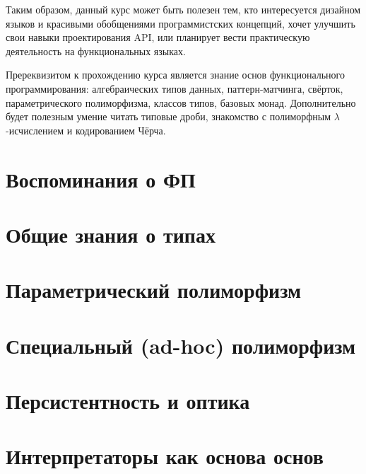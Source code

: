 \documentclass[12pt]{article}
\begin{document}
    Таким образом, данный курс может быть полезен тем, кто интересуется дизайном языков и красивыми обобщениями программистских концепций, хочет улучшить свои навыки проектирования API, или планирует вести практическую деятельность на функциональных языках.

    Пререквизитом к прохождению курса является знание основ функционального программирования: алгебраических типов данных, паттерн-матчинга, свёрток, параметрического полиморфизма, классов типов, базовых монад.
    Дополнительно будет полезным умение читать типовые дроби, знакомство с полиморфным $\lambda$-исчислением и кодированием Чёрча.


    \clearpage


    \section{Воспоминания о ФП}

    

    \clearpage


    \section{Общие знания о типах}

    

    \clearpage


    \section{Параметрический полиморфизм} \label{sec:parametric-polymorphism}

    

    \clearpage


    \section{Специальный (ad-hoc) полиморфизм} \label{sec:ad-hoc}
%
    

    \clearpage


    \section{Персистентность и оптика}
%
%    
%


    \section{Интерпретаторы как основа основ}
\end{document}
